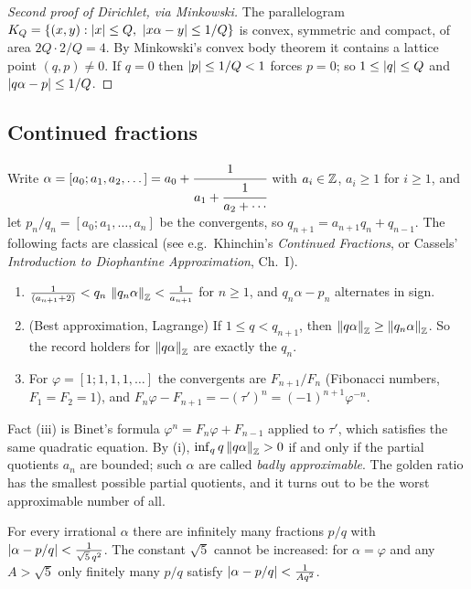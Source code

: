 \begin{proof}[Second proof of Dirichlet, via Minkowski]
The parallelogram $K_Q=\{(x,y):\abs{x}\le Q,\ \abs{x\alpha-y}\le1/Q\}$ is convex, symmetric and compact,
of area $2Q\cdot 2/Q=4$. By Minkowski's convex body theorem it contains a lattice point
$(q,p)\neq0$. If $q=0$ then $\left\lvert p \right\rvert\le1/Q<1$ forces $p=0$; so $1\le\left\lvert q \right\rvert\le Q$ and
$\left\lvert q\alpha-p \right\rvert\le1/Q$.
\end{proof}

\subsection*{Continued fractions}

Write $\alpha=[a_0;a_1,a_2,\dots]=a_0+\cfrac{1}{a_1+\cfrac{1}{a_2+\dotsb}}$ with $a_i\in\mathbb{Z}$, $a_i\ge1$
for $i\ge1$, and let $p_n/q_n=[a_0;a_1,\dots,a_n]$ be the convergents, so
$q_{n+1}=a_{n+1}q_n+q_{n-1}$. The following facts are classical (see e.g.\ Khinchin's
\emph{Continued Fractions}, or Cassels' \emph{Introduction to Diophantine Approximation}, Ch.~I).
\begin{enumerate}[nosep,label=(\roman*)]
\item $\frac{1}{(a_{n+1}+2)}<q_n\,\left\lVert q_n\alpha \right\rVert_{\mathbb{Z}}<\frac{1}{a_{n+1}}$ for $n\ge1$, and $q_n\alpha-p_n$
  alternates in sign.
\item (Best approximation, Lagrange) If $1\le q<q_{n+1}$, then $\left\lVert q\alpha \right\rVert_{\mathbb{Z}}\ge\left\lVert q_n\alpha \right\rVert_{\mathbb{Z}}$.
  So the record holders for $\left\lVert q\alpha \right\rVert_{\mathbb{Z}}$ are exactly the $q_n$.
\item For $\varphi=[1;1,1,1,\dots]$ the convergents are $F_{n+1}/F_n$ (Fibonacci numbers,
  $F_1=F_2=1$), and $F_n\varphi-F_{n+1}=-(\tau')^{n}=(-1)^{n+1}\varphi^{-n}$.
\end{enumerate}
Fact (iii) is Binet's formula $\varphi^n=F_n\varphi+F_{n-1}$ applied to $\tau'$, which satisfies the
same quadratic equation. By (i), $\inf_q q\left\lVert q\alpha \right\rVert_{\mathbb{Z}}>0$ if and only if the partial quotients $a_n$
are bounded; such $\alpha$ are called \emph{badly approximable}. The golden ratio has the smallest
possible partial quotients, and it turns out to be the worst approximable number of all.

\begin{theorem}[Hurwitz 1891]\label{ERG:thm:hurwitz}
For every irrational $\alpha$ there are infinitely many fractions $p/q$ with
$\left\lvert \alpha-p/q \right\rvert<\frac1{\sqrt5\,q^2}$. The constant $\sqrt5$ cannot be increased: for
$\alpha=\varphi$ and any $A>\sqrt5$ only finitely many $p/q$ satisfy $\left\lvert \alpha-p/q \right\rvert<\frac1{Aq^2}$.
\end{theorem}

